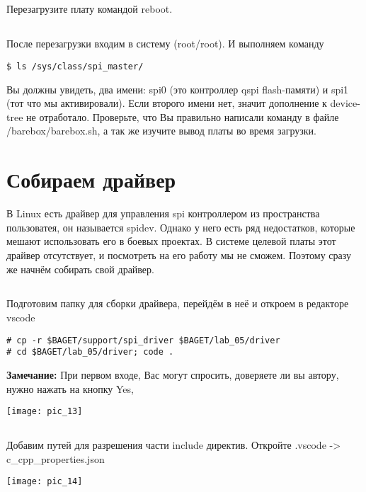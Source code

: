 \subsection{}Перезагрузите плату командой reboot. 

\subsection{}После перезагрузки входим в систему (root/root). И выполняем команду
\begin{lstlisting}[style=bash]
$ ls /sys/class/spi_master/
\end{lstlisting}
Вы должны увидеть, два имени: spi0 (это контроллер qspi flash-памяти) и spi1 (тот что мы активировали). Если второго имени нет, значит дополнение к device-tree не отработало. Проверьте, что Вы правильно написали команду в файле /barebox/barebox.sh, а так же изучите вывод платы во время загрузки. 

\section{Собираем драйвер}
В Linux есть драйвер для управления spi контроллером из пространства пользоватея, он называется spidev. Однако у него есть ряд недостатков, которые мешают использовать его в боевых проектах. В системе целевой платы этот драйвер отсутствует, и посмотреть на его работу мы не сможем. Поэтому сразу же начнём собирать свой драйвер.

\subsection{}Подготовим папку для сборки драйвера, перейдём в неё и откроем в редакторе vscode
\begin{lstlisting}[style=bash]
# cp -r $BAGET/support/spi_driver $BAGET/lab_05/driver 
# cd $BAGET/lab_05/driver; code .
\end{lstlisting}
\textbf{Замечание:} При первом входе, Вас могут спросить, доверяете ли вы автору, нужно нажать на кнопку Yes,  
\begin{center}
	\texttt{[image: pic\_13]}
\end{center}

\subsection{}Добавим путей для разрешения части include директив. Откройте .vscode -> c\_cpp\_properties.json
\begin{center}
	\texttt{[image: pic\_14]}
\end{center}


